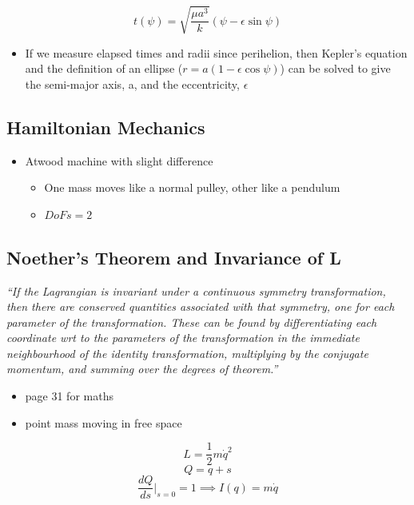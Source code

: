 \documentclass[a4paper,11pt,normalem]{article}
\begin{document}
\[
    t(\psi) = \sqrt{\frac{\mu a^3}{k}} (\psi - \epsilon\sin\psi)
\]

\begin{itemize}
\item
  If we measure elapsed times and radii since perihelion, then Kepler's
  equation and the definition of an ellipse
  (\(r = a(1 - \epsilon\cos\psi)\)) can be solved to give the semi-major
  axis, a, and the eccentricity, \(\epsilon\)
\end{itemize}

\subsection{Hamiltonian Mechanics}\label{hamiltonian-mechanics}

\begin{example}

\begin{itemize}
\item
  Atwood machine with slight difference
  \begin{itemize}
  \item
    One mass moves like a normal pulley, other like a pendulum
  \item
    \(DoFs = 2\)
  \end{itemize}
\end{itemize}
\end{example}

\subsection{Noether's Theorem and Invariance of L}

\emph{``If the Lagrangian is invariant under a continuous symmetry
transformation, then there are conserved quantities associated with that
symmetry, one for each parameter of the transformation. These can be
found by differentiating each coordinate wrt to the parameters of the
transformation in the immediate neighbourhood of the identity
transformation, multiplying by the conjugate momentum, and summing over
the degrees of theorem.''}

\begin{itemize}
\item
  page 31 for maths
\item
  point mass moving in free space
\end{itemize}

\[
    L = \frac{1}{2}m\dot{q}^2 \] \[
    Q = q + s \] \[
    \frac{dQ}{ds}\Bigg|_{s_{} = 0} = 1 \implies I(q) = m\dot{q}
\]
\end{document}
